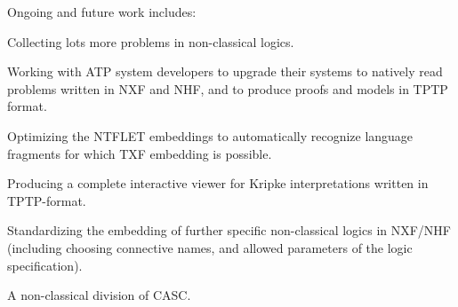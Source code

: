 \documentclass{ceurart}
\newenvironment{packed_itemize}{
\vspace*{-0.5em}
\begin{itemize}
\setlength{\partopsep}{0pt}
\setlength{\itemsep}{1pt}
\setlength{\parskip}{0pt}
\setlength{\parsep}{0pt}
}{\end{itemize}}
\begin{document}
Ongoing and future work includes:
\begin{packed_itemize}
\item Collecting lots more problems in non-classical logics.
\item Working with ATP system developers to upgrade their systems to natively read problems 
      written in NXF and NHF, and to produce proofs and models in TPTP format.
\item Optimizing the NTFLET embeddings to automatically recognize language fragments for which
      TXF embedding is possible.
\item Producing a complete interactive viewer for Kripke interpretations written in TPTP-format.
\item Standardizing the embedding of further specific non-classical logics in NXF/NHF (including
      choosing connective names, and allowed parameters of the logic specification).
\item A non-classical division of CASC.
\end{packed_itemize}

% 

\end{document}
